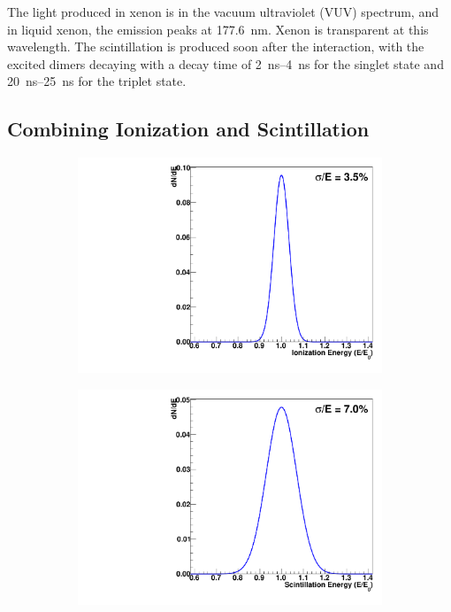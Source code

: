 \documentclass[herrin-thesis.tex]{subfiles}
\begin{document}
The light produced in xenon is in the vacuum ultraviolet (VUV) spectrum, and in liquid xenon, the emission peaks at \SI{177.6}{\nm}. Xenon is transparent at this wavelength. The scintillation is produced soon after the interaction, with the excited dimers decaying with a decay time of \SIrange{2}{4}{\ns} for the singlet state and \SIrange{20}{25}{\ns} for the triplet state\cite{Aprile:2010uq}.

\subsection{Combining Ionization and Scintillation}
\label{sec:xe_combining_ion_and_scint}

\begin{figure}[htb]
\centering
\begin{subfigure}[c]{0.45\linewidth}
\includegraphics[width=\textwidth]{./plots/xe_anticorrelation_ioniz.pdf}
\end{subfigure}\hspace{0.05\linewidth}\hfill%
\begin{subfigure}[c]{0.45\linewidth}
\includegraphics[width=\textwidth]{./plots/xe_anticorrelation_scint.pdf}

\end{subfigure}
\end{figure}
\end{document}
